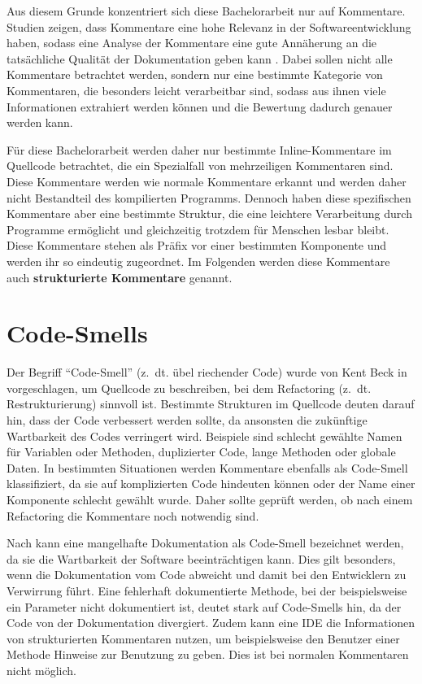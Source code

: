 Aus diesem Grunde konzentriert sich diese Bachelorarbeit nur auf Kommentare. Studien zeigen, dass Kommentare eine hohe Relevanz in der Softwareentwicklung haben, sodass eine Analyse der Kommentare eine gute Annäherung an die tatsächliche Qualität der Dokumentation geben kann \cite[S. 71]{AStudyoftheDocumentationEssentialtoSoftwareMaintenance}. Dabei sollen nicht alle Kommentare betrachtet werden, sondern nur eine bestimmte Kategorie von Kommentaren, die besonders leicht verarbeitbar sind, sodass aus ihnen viele Informationen extrahiert werden können und die Bewertung dadurch genauer werden kann. 

Für diese Bachelorarbeit werden daher nur bestimmte Inline-Kommentare im Quellcode betrachtet, die ein Spezialfall von mehrzeiligen Kommentaren sind.
Diese Kommentare werden wie normale Kommentare erkannt und werden daher nicht Bestandteil des kompilierten Programms. Dennoch haben diese spezifischen Kommentare aber eine bestimmte Struktur, die eine leichtere Verarbeitung durch Programme ermöglicht und gleichzeitig trotzdem für Menschen lesbar bleibt. Diese Kommentare stehen als Präfix vor einer bestimmten Komponente und werden ihr so eindeutig zugeordnet. Im Folgenden werden diese Kommentare auch \textbf{strukturierte Kommentare} genannt. 





\section{Code-Smells}\label{chapter:code_smell}
Der Begriff \enquote{Code-Smell} (z.~dt. übel riechender Code)  wurde von Kent Beck in \cite[S. 71 ff.]{fowler2019refactoring}  vorgeschlagen, um Quellcode zu beschreiben, bei dem Refactoring (z.~dt. Restrukturierung) sinnvoll ist. Bestimmte Strukturen im Quellcode deuten darauf hin, dass der Code verbessert werden sollte, da ansonsten die zukünftige Wartbarkeit des Codes verringert wird. Beispiele sind schlecht gewählte Namen für Variablen oder Methoden, duplizierter Code, lange Methoden oder globale Daten. In bestimmten Situationen werden Kommentare ebenfalls als Code-Smell klassifiziert, da sie auf komplizierten  Code hindeuten können oder der Name einer Komponente schlecht gewählt wurde. Daher sollte geprüft werden, ob nach einem Refactoring die Kommentare noch notwendig sind.

Nach \cite[S. 249-250]{JavadocViolationsandTheirEvolutioninOpen-SourceSoftware} kann eine mangelhafte Dokumentation als Code-Smell bezeichnet werden, da sie die Wartbarkeit der Software beeinträchtigen kann. Dies gilt besonders, wenn die Dokumentation vom Code abweicht und damit bei den Entwicklern zu Verwirrung führt. Eine fehlerhaft dokumentierte Methode, bei der beispielsweise ein Parameter nicht dokumentiert ist, deutet stark auf Code-Smells hin, da der Code von der Dokumentation divergiert. Zudem kann eine \ac{IDE} die Informationen von strukturierten Kommentaren nutzen, um beispielsweise den Benutzer einer Methode Hinweise zur Benutzung zu geben. Dies ist bei normalen Kommentaren nicht möglich. 

